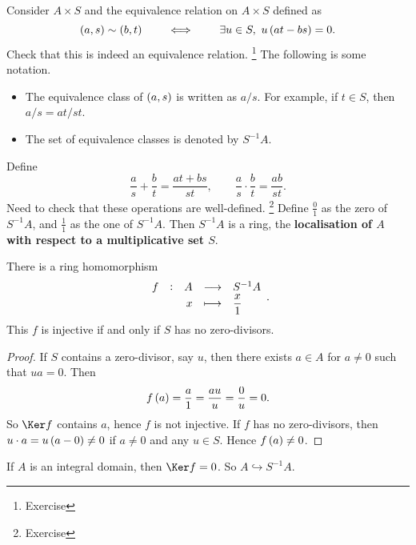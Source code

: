 \begin{definition}
Consider $ A \times S $ and the equivalence relation on $ A \times S $ defined as
$$ \br{a, s} \sim \br{b, t} \qquad \iff \qquad \exists u \in S, \ u\br{at - bs} = 0. $$
Check that this is indeed an equivalence relation. \footnote{Exercise} The following is some notation.
\begin{itemize}
\item The equivalence class of $ \br{a, s} $ is written as $ a / s $. For example, if $ t \in S $, then $ a / s = at / st $.
\item The set of equivalence classes is denoted by $ S^{-1}A $.
\end{itemize}
Define
$$ \dfrac{a}{s} + \dfrac{b}{t} = \dfrac{at + bs}{st}, \qquad \dfrac{a}{s} \cdot \dfrac{b}{t} = \dfrac{ab}{st}. $$
Need to check that these operations are well-defined. \footnote{Exercise} Define $ \tfrac{0}{1} $ as the zero of $ S^{-1}A $, and $ \tfrac{1}{1} $ as the one of $ S^{-1}A $. Then $ S^{-1}A $ is a ring, the \textbf{localisation of $ A $ with respect to a multiplicative set $ S $}.
\end{definition}

\begin{lemma}
There is a ring homomorphism
$$ \function[f]{A}{S^{-1}A}{x}{\dfrac{x}{1}}. $$
This $ f $ is injective if and only if $ S $ has no zero-divisors.
\end{lemma}

\begin{proof}
If $ S $ contains a zero-divisor, say $ u $, then there exists $ a \in A $ for $ a \ne 0 $ such that $ ua = 0 $. Then
$$ f\br{a} = \dfrac{a}{1} = \dfrac{au}{u} = \dfrac{0}{u} = 0. $$
So $ \Ker f $ contains $ a $, hence $ f $ is not injective. If $ f $ has no zero-divisors, then $ u \cdot a = u\br{a - 0} \ne 0 $ if $ a \ne 0 $ and any $ u \in S $. Hence $ f\br{a} \ne 0 $.
\end{proof}


If $ A $ is an integral domain, then $ \Ker f = 0 $. So $ A \hookrightarrow S^{-1}A $.

\pagebreak

